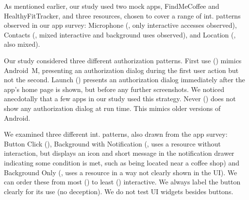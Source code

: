 As mentioned earlier, our study used two mock apps, FindMeCoffee and
HealthyFitTracker, and three resources, chosen to cover a range of int.
 patterns observed in our app survey: Microphone (\mic, 
only interactive accesses observed), Contacts (\contacts, mixed interactive and 
background uses observed), and Location
(\location, also mixed).

Our study considered three different authorization patterns. 
First use (\first) mimics Android~M, presenting an
authorization dialog during the first user action but not the
second. Launch (\launch) presents an authorization dialog immediately
after the app's home page is shown, but before any further screenshots.
We noticed anecdotally that a few apps in our study used this strategy.
Never
(\never) does not show any authorization dialog at run time. This
mimics older versions of Android.


We examined three different int.
 patterns, also
drawn from the app survey: Button Click (\textit{\interactive{}}),
Background with Notification (\backgroundnotify, uses a resource without 
interaction, but displays an icon and short message in the notification 
drawer indicating some condition is met, such as being located near a coffee shop)
and Background Only 
(\backgroundonly, uses a resource in a way not clearly shown in the UI). 
We can order these from most (\interactive) to least
(\backgroundonly) interactive. We always label the
button clearly for its use (no deception). We
do not test UI widgets besides buttons.

